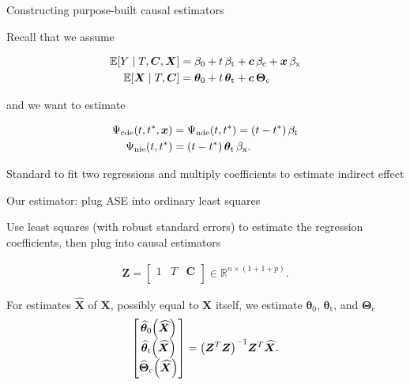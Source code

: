 \documentclass{beamer}
\theoremstyle{remark}
\renewcommand{\c}{\bm c}
\newcommand{\x}{\bm x}
\newcommand{\C}{\bm C}
\newcommand{\X}{\bm X}
\newcommand{\Z}{\bm Z}
\newcommand{\Xhat}{\widehat{\X}}
\newcommand \R {\mathbb{R}}
\newcommand{\thetazero}{\bm \theta_0}
\newcommand{\thetat}{\bm \theta_\text{t}}
\newcommand{\Thetac}{\bm \Theta_\text{c}}
\newcommand \thetazerohat [1] {\widehat{\bm \theta}_0 \paren*{#1}}
\newcommand \thetathat [1] {\widehat{\bm \theta}_\text{t} \paren*{#1}}
\newcommand \Thetachat [1] {\widehat{\bm \Theta}_\text{c} \paren*{#1}}
\newcommand{\betazero}{\beta_0}
\newcommand{\betat}{\beta_\text{t}}
\newcommand{\betac}{\beta_\text{c}}
\newcommand{\betax}{\beta_\text{x}}
\newcommand{\cde}{\Psi_\text{cde} \paren*{t, t^*, \x}}
\newcommand{\nde}{\Psi_\text{nde} \paren*{t, t^*}}
\newcommand{\nie}{\Psi_\text{nie} \paren*{t, t^*}}
\DeclarePairedDelimiter{\paren}{(}{)}
\DeclarePairedDelimiter{\brac}{[}{]}
\newcommand{\E}[2][]{%
   \ifthenelse{ \equal{#1}{} }
      {\ensuremath{\mathbb{E} \brac*{#2}}}
      {\ensuremath{\mathbb{E} \brac*{#2 \mid #1}}}
}
\begin{document}
\begin{frame}{Constructing purpose-built causal estimators}

    Recall that we assume

    \begin{align*}
        \E[T, \C, \X]{Y}
         & = \betazero
        + t \, \betat
        + \c \, \betac
        + \x \, \betax  \\
        \E[T, \C]{\X}
         & = \thetazero
        + t \, \thetat
        + \c \, \Thetac
    \end{align*}

    and we want to estimate

    \begin{align*}
        \cde & = \nde = \paren*{t - t^*} \, \betat      \\
        \nie & = \paren*{t - t^*} \, \thetat \, \betax.
    \end{align*}

    Standard to fit two regressions and multiply coefficients to estimate indirect effect \citep{vanderweele_mediation_2014}


\end{frame}

\begin{frame}{Our estimator: plug ASE into ordinary least squares}

    Use least squares (with robust standard errors) to estimate the regression coefficients, then plug into causal estimators

    \begin{align*}
        \Z = \begin{bmatrix}
            1 & T & \C \\
        \end{bmatrix} \in \R^{n \times (1 + 1 + p)}.
    \end{align*}

    For estimates $\Xhat$ of $\X$, possibly equal to $\X$ itself, we estimate $\thetazero$, $\thetat$, and $\Thetac$
    \begin{align*}
        \begin{bmatrix}
            \thetazerohat{\Xhat} \\
            \thetathat{\Xhat}    \\
            \Thetachat{\Xhat}
        \end{bmatrix}
        = \paren*{\Z^T \Z}^{-1} \Z^T \Xhat.
    \end{align*}
\end{frame}
\end{document}
